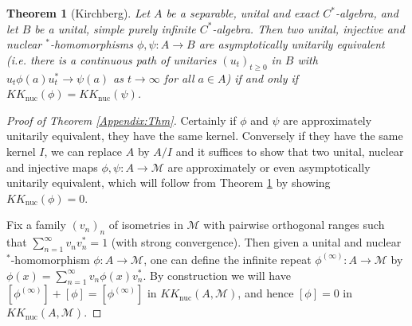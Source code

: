 \documentclass[10pt,a4paper]{amsart}
\newtheorem{thm}{Theorem}
\begin{document}
\begin{thm}[Kirchberg]\label{Kirchberg}
Let $A$ be a separable, unital and exact $C^*$-algebra, and let $B$ be a unital, simple purely infinite $C^*$-algebra.  Then two unital, injective and nuclear $^*$-homomorphisms $\phi,\psi:A\to B$ are asymptotically unitarily equivalent (i.e. there is a continuous path of unitaries $(u_t)_{t\geq 0}$ in $B$ with $u_t\phi(a)u_t^*\to \psi(a)$ as $t\to\infty$ for all $a\in A$) if and only if $KK_{\mathrm{nuc}}(\phi)=KK_{\mathrm{nuc}}(\psi)$.
\end{thm}

\begin{proof}[Proof of Theorem \ref{Appendix:Thm}]
Certainly if $\phi$ and $\psi$ are approximately unitarily equivalent, they have the same kernel. Conversely if they have the same kernel $I$, we can replace $A$ by $A/I$ and it suffices to show that two unital, nuclear and injective maps $\phi,\psi:A\to\mathcal M$ are approximately or even asymptotically unitarily equivalent, which will follow from Theorem \ref{Kirchberg} by showing $KK_{\mathrm{nuc}}(\phi)=0$.

Fix a family $(v_n)_n$ of isometries in $\mathcal M$ with pairwise orthogonal ranges such that $\sum_{n=1}^\infty v_nv_n^*=1$ (with strong convergence). Then given a unital and nuclear $^*$-homomorphism $\phi:A\to\mathcal M$, one can define the infinite repeat $\phi^{(\infty)}:A\to \mathcal M$ by $\phi(x)=\sum_{n=1}^\infty v_n\phi(x)v_n^*$. By construction we will have $[\phi^{(\infty)}]+[\phi]=[\phi^{(\infty)}]$ in $KK_{\mathrm{nuc}}(A,\mathcal M)$, and hence $[\phi]=0$ in $KK_{\mathrm{nuc}}(A,\mathcal M)$.
\end{proof}
\end{document}
